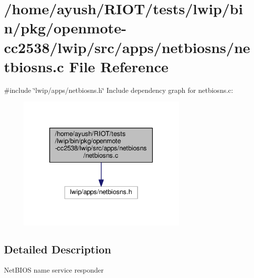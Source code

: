 \hypertarget{openmote-cc2538_2lwip_2src_2apps_2netbiosns_2netbiosns_8c}{}\section{/home/ayush/\+R\+I\+O\+T/tests/lwip/bin/pkg/openmote-\/cc2538/lwip/src/apps/netbiosns/netbiosns.c File Reference}
\label{openmote-cc2538_2lwip_2src_2apps_2netbiosns_2netbiosns_8c}
{\ttfamily \#include \char`\"{}lwip/apps/netbiosns.\+h\char`\"{}}\newline
Include dependency graph for netbiosns.\+c\+:
\nopagebreak
\begin{figure}[H]
\begin{center}
\leavevmode
\includegraphics[width=237pt]{openmote-cc2538_2lwip_2src_2apps_2netbiosns_2netbiosns_8c__incl}
\end{center}
\end{figure}


\subsection{Detailed Description}
Net\+B\+I\+OS name service responder 
